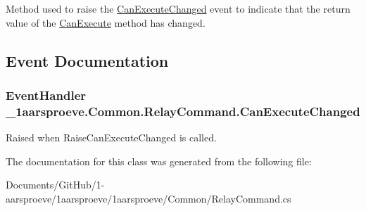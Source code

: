 Method used to raise the \hyperlink{class__1aarsproeve_1_1_common_1_1_relay_command_a4502fa3e74d23cc9cd33cec559e96390}{Can\+Execute\+Changed} event to indicate that the return value of the \hyperlink{class__1aarsproeve_1_1_common_1_1_relay_command_a3c52d00e1d9ab7ab06cc4244b50fbee2}{Can\+Execute} method has changed. 



\subsection{Event Documentation}
\hypertarget{class__1aarsproeve_1_1_common_1_1_relay_command_a4502fa3e74d23cc9cd33cec559e96390}{}
\subsubsection[{Can\+Execute\+Changed}]{\setlength{\rightskip}{0pt plus 5cm}Event\+Handler \+\_\+1aarsproeve.\+Common.\+Relay\+Command.\+Can\+Execute\+Changed}\label{class__1aarsproeve_1_1_common_1_1_relay_command_a4502fa3e74d23cc9cd33cec559e96390}


Raised when Raise\+Can\+Execute\+Changed is called. 



The documentation for this class was generated from the following file\+:\begin{DoxyCompactItemize}
\item 
Documents/\+Git\+Hub/1-\/aarsproeve/1aarsproeve/1aarsproeve/\+Common/Relay\+Command.\+cs\end{DoxyCompactItemize}
